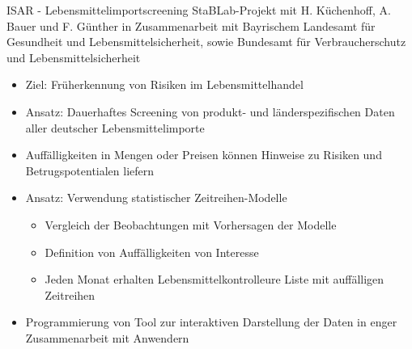 \documentclass[
  10pt,
  ignorenonframetext,
]{beamer}
\providecommand{\tightlist}{%
  \setlength{\itemsep}{0pt}\setlength{\parskip}{0pt}}
\begin{document}
\begin{frame}{ISAR - Lebensmittelimportscreening}
\label{isar---lebensmittelimportscreening}
StaBLab-Projekt mit H. Küchenhoff, A. Bauer und F. Günther in
Zusammenarbeit mit Bayrischem Landesamt für Gesundheit und
Lebensmittelsicherheit, sowie Bundesamt für Verbraucherschutz und
Lebensmittelsicherheit

\begin{itemize}
\tightlist
\item
  Ziel: Früherkennung von Risiken im Lebensmittelhandel
\item
  Ansatz: Dauerhaftes Screening von produkt- und länderspezifischen
  Daten aller deutscher Lebensmittelimporte
\item
  Auffälligkeiten in Mengen oder Preisen können Hinweise zu Risiken und
  Betrugspotentialen liefern
\item
  Ansatz: Verwendung statistischer Zeitreihen-Modelle

  \begin{itemize}
  \tightlist
  \item
    Vergleich der Beobachtungen mit Vorhersagen der Modelle
  \item
    Definition von Auffälligkeiten von Interesse
  \item
    Jeden Monat erhalten Lebensmittelkontrolleure Liste mit auffälligen
    Zeitreihen
  \end{itemize}
\item
  Programmierung von Tool zur interaktiven Darstellung der Daten in
  enger Zusammenarbeit mit Anwendern
\end{itemize}
\end{frame}
\end{document}

